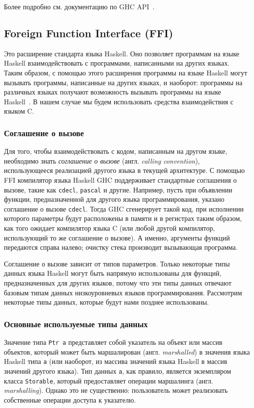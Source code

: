 	Более подробно см. документацию по GHC API~\autocite{apidoc}. %
	\subsection{Foreign Function Interface (FFI)} Это расширение стандарта языка Haskell. Оно позволяет программам на языке Haskell взаимодействовать с программами, написанными на других языках. Таким образом, с помощью этого расширения программы на языке Haskell могут вызывать программы, написанные на других языках, и наоборот: программы на различных языках получают возможность вызывать программы на языке Haskell~\autocite{ffi}. В нашем случае мы будем использовать средства взаимодействия с языком C. 
	
	\subsubsection{Соглашение о вызове} Для того, чтобы взаимодействовать с кодом, написанным на другом языке, необходимо знать \textit{соглашение о вызове} (англ. \textit{calling convention}), использующееся реализацией другого языка в текущей архитектуре. С помощью FFI компилятор языка Haskell GHC поддерживает стандартные соглашения о вызове, такие как \lstinline{cdecl}, \lstinline{pascal} и другие. Например, пусть при объявлении функции, предназначенной для другого языка программирования, указано соглашение о вызове \lstinline{cdecl}. Тогда GHC сгенерирует такой код, при исполнении которого параметры будут расположены в памяти и в регистрах таким образом, как того ожидает компилятор языка C (или любой другой компилятор, использующий то же соглашение о вызове). А именно, аргументы функций передаются справа налево; очистку стека производит вызывающая программа.
	
	Соглашение о вызове зависит от типов параметров. Только некоторые типы данных языка Haskell могут быть напрямую использованы для функций, предназначенных для других языков, потому что эти типы данных отвечают базовым типам данных низкоуровневых языков программирования. Рассмотрим некоторые типы данных, которые будут нами позднее использованы.
	
	\subsubsection{Основные используемые типы данных} Значение типа \lstinline{Ptr a} представляет собой указатель на объект или массив объектов, который может быть маршалирован (англ. \textit{marshalled}) в значения языка Haskell типа \lstinline{a} (или наоборот, из массива значений языка Haskell в массив значений другого языка). Тип данных \lstinline{a}, как правило, является экземпляром класса \lstinline{Storable}, который предоставляет операции маршалинга (англ. \textit{marshalling}). Однако это не существенно: пользователь может реализовать собственные операции доступа к указателю.
	
